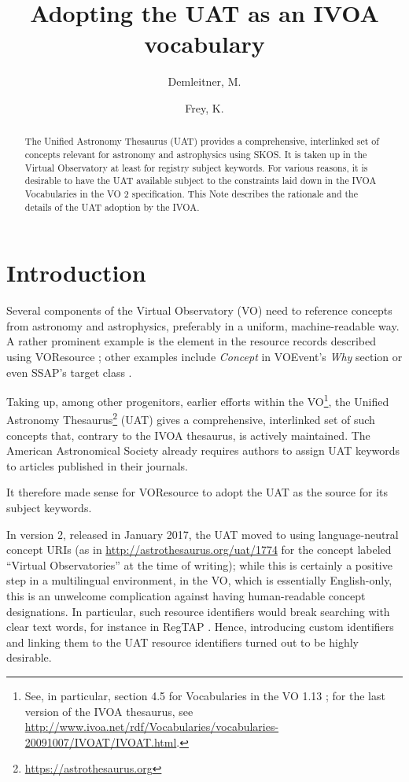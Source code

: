 \documentclass[11pt,a4paper]{ivoa}
\title{Adopting the UAT as an IVOA vocabulary}
\author[https://wiki.ivoa.net/twiki/bin/view/IVOA/MarkusDemleitner]{Demleitner, M.}
\author{Frey, K.}
\begin{document}
\begin{abstract}
The Unified Astronomy Thesaurus (UAT) provides a comprehensive, interlinked
set of concepts relevant for astronomy and astrophysics using SKOS.  It
is taken up in the Virtual Observatory at least for registry subject
keywords.  For various reasons, it is desirable to have the UAT
available subject to the constraints laid down in the IVOA Vocabularies in
the VO 2 specification.  This Note describes the rationale and the
details of the UAT adoption by the IVOA.
\end{abstract}



\section{Introduction}

Several components of the Virtual Observatory (VO) need to reference
concepts from astronomy and astrophysics, preferably in a uniform,
machine-readable way.  A rather prominent example is the 
element in the resource records described using VOResource
\citep{2018ivoa.spec.0625P}; other examples include \emph{Concept} in
VOEvent's \emph{Why} section \citep{2011ivoa.spec.0711S} or even SSAP's
target class \citep{2012ivoa.spec.0210T}.

Taking up, among other progenitors, earlier efforts within the
VO\footnote{See, in particular, section 4.5 for Vocabularies in the VO
1.13 \citep{2009ivoa.spec.1007G}; for the last version of the IVOA
thesaurus, see
\url{http://www.ivoa.net/rdf/Vocabularies/vocabularies-20091007/IVOAT/IVOAT.html}.},
the Unified Astronomy
Thesaurus\footnote{\url{https://astrothesaurus.org}} (UAT) gives a
comprehensive, interlinked set of such concepts that, contrary to the
IVOA thesaurus, is actively maintained.  
The American Astronomical Society already requires authors to
assign UAT keywords to articles published in their journals.

It therefore made sense for VOResource to adopt the UAT as the source
for its subject keywords.

In version 2, released in January 2017, the UAT 
moved to using language-neutral
concept URIs (as in \url{http://astrothesaurus.org/uat/1774} for the
concept labeled ``Virtual Observatories'' at the time of writing); while
this is certainly a positive step in a multilingual environment, in the
VO, which is essentially English-only, this is an unwelcome complication
against having human-readable concept designations.  In particular, such
resource identifiers would break searching with clear text words, for
instance in RegTAP \citep{2019ivoa.spec.1011D}.  Hence, introducing
custom identifiers and linking them to the UAT resource identifiers
turned out to be highly desirable.
\end{document}
